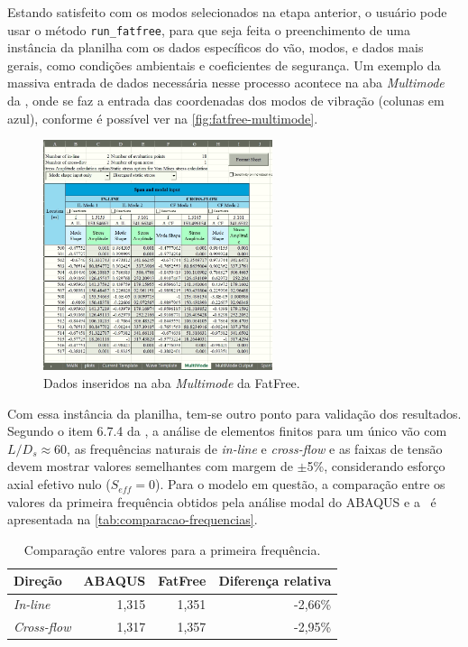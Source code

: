 Estando satisfeito com os modos selecionados na etapa anterior, o usuário pode usar o método \texttt{run\_fatfree}, para que seja feita o preenchimento de uma instância da planilha com os dados específicos do vão, modos, e dados mais gerais, como condições ambientais e coeficientes de segurança. Um exemplo da massiva entrada de dados necessária nesse processo acontece na aba \textit{Multimode} da \fatfree, onde se faz a entrada das coordenadas dos modos de vibração (colunas em azul), conforme é possível ver na \autoref{fig:fatfree-multimode}.

\begin{figure}[!ht]
	\centering
	\caption{Dados inseridos na aba \textit{Multimode} da FatFree.}\label{fig:fatfree-multimode}
	\includegraphics[width=0.6\textwidth]{imagens/exemplo/fatfree_multimode}
\end{figure}

Com essa instância da planilha, tem-se outro ponto para validação dos resultados.
Segundo o item 6.7.4 da , a análise de elementos finitos para um único vão com $L / D_s \approx 60$, as frequências naturais de \textit{in-line} e \textit{cross-flow} e as faixas de tensão devem mostrar valores semelhantes com margem de $\pm$5\%, considerando esforço axial efetivo nulo ($S_{eff} = 0$). Para o modelo em questão, a comparação entre os valores da primeira frequência obtidos pela análise modal do ABAQUS e a \fatfree\ é apresentada na \autoref{tab:comparacao-frequencias}.

\begin{table}[!ht]
\renewcommand{\arraystretch}{1.2}
\centering
\caption{Comparação entre valores para a primeira frequência.}\label{tab:comparacao-frequencias}
\begin{tabular}{lrrr}
\toprule
Direção & ABAQUS & FatFree & Diferença relativa\\
\midrule
\textit{In-line}    & 1,315 & 1,351 & -2,66\%\\ %
\textit{Cross-flow} & 1,317 & 1,357 & -2,95\%\\ %
\bottomrule
\end{tabular}
\end{table}

